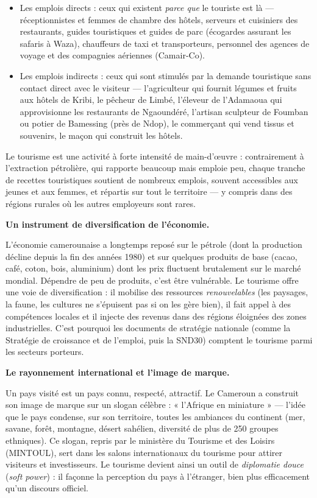 \documentclass[11pt]{article}
\newcommand{\cle}[1]{{\popxbold\color{popdark}#1}}
\newcounter{popsec}
\newcounter{popsub}
\newcommand{\courssub}[1]{%
  \stepcounter{popsub}%
  \par\vspace{9pt}\noindent{\popxbold\fontsize{11.5}{13}\selectfont\color{popink}{\color{poporange}\thepopsec.\thepopsub}\hspace{6pt}#1}\par\nopagebreak\vspace{4pt}
}
\begin{document}
\begin{itemize}
\item Les \cle{emplois directs} : ceux qui existent \emph{parce que} le touriste est là — réceptionnistes et femmes de chambre des hôtels, serveurs et cuisiniers des restaurants, guides touristiques et guides de parc (écogardes assurant les safaris à Waza), chauffeurs de taxi et transporteurs, personnel des agences de voyage et des compagnies aériennes (Camair-Co).
\item Les \cle{emplois indirects} : ceux qui sont stimulés par la demande touristique sans contact direct avec le visiteur — l'agriculteur qui fournit légumes et fruits aux hôtels de Kribi, le pêcheur de Limbé, l'éleveur de l'Adamaoua qui approvisionne les restaurants de Ngaoundéré, l'artisan sculpteur de Foumban ou potier de Bamessing (près de Ndop), le commerçant qui vend tissus et souvenirs, le maçon qui construit les hôtels.
\end{itemize}

Le tourisme est une activité à forte intensité de main-d'œuvre : contrairement à l'extraction pétrolière, qui rapporte beaucoup mais emploie peu, chaque tranche de recettes touristiques soutient de nombreux emplois, souvent accessibles aux jeunes et aux femmes, et répartis sur tout le territoire — y compris dans des régions rurales où les autres employeurs sont rares.

\textbf{Un instrument de diversification de l'économie.}\par
L'économie camerounaise a longtemps reposé sur le pétrole (dont la production décline depuis la fin des années 1980) et sur quelques produits de base (cacao, café, coton, bois, aluminium) dont les prix fluctuent brutalement sur le marché mondial. Dépendre de peu de produits, c'est être vulnérable. Le tourisme offre une voie de \cle{diversification} : il mobilise des ressources \emph{renouvelables} (les paysages, la faune, les cultures ne s'épuisent pas si on les gère bien), il fait appel à des compétences locales et il injecte des revenus dans des régions éloignées des zones industrielles. C'est pourquoi les documents de stratégie nationale (comme la Stratégie de croissance et de l'emploi, puis la SND30) comptent le tourisme parmi les secteurs porteurs.

\courssub{L'importance politique du tourisme}

\textbf{Le rayonnement international et l'image de marque.}\par
Un pays visité est un pays connu, respecté, attractif. Le Cameroun a construit son image de marque sur un slogan célèbre : \cle{« l'Afrique en miniature »} — l'idée que le pays condense, sur son territoire, toutes les ambiances du continent (mer, savane, forêt, montagne, désert sahélien, diversité de plus de 250 groupes ethniques). Ce slogan, repris par le ministère du Tourisme et des Loisirs (MINTOUL), sert dans les salons internationaux du tourisme pour attirer visiteurs et investisseurs. Le tourisme devient ainsi un outil de \emph{diplomatie douce} (\emph{soft power}) : il façonne la perception du pays à l'étranger, bien plus efficacement qu'un discours officiel.
\end{document}
